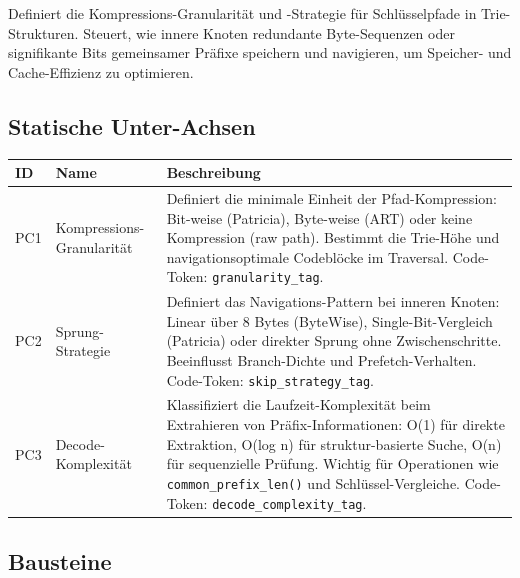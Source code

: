 Definiert die Kompressions-Granularität und -Strategie für Schlüsselpfade in Trie-Strukturen. Steuert, wie innere Knoten redundante Byte-Sequenzen oder signifikante Bits gemeinsamer Präfixe speichern und navigieren, um Speicher- und Cache-Effizienz zu optimieren.

\subsection*{Statische Unter-Achsen}

\begin{scriptsize}
\begin{longtable}{@{}>{\raggedright\arraybackslash}p{1.8cm} >{\raggedright\arraybackslash}p{3.2cm} >{\raggedright\arraybackslash}p{8.5cm}@{}}
\toprule
ID & Name & Beschreibung \\
\midrule
\endhead%
PC1 & Kompressions-Granularität & Definiert die minimale Einheit der Pfad-Kompression: Bit-weise (Patricia), Byte-weise (ART) oder keine Kompression (raw path). Bestimmt die Trie-Höhe und navigationsoptimale Codeblöcke im Traversal. Code-Token: \texttt{granularity\_\allowbreak{}tag}. \\
PC2 & Sprung-Strategie & Definiert das Navigations-Pattern bei inneren Knoten: Linear über 8 Bytes (Byte\allowbreak{}Wise), Single-Bit-Vergleich (Patricia) oder direkter Sprung ohne Zwischenschritte. Beeinflusst Branch-Dichte und Prefetch-Verhalten. Code-Token: \texttt{skip\_\allowbreak{}strategy\_\allowbreak{}tag}. \\
PC3 & Decode-Komplexität & Klassifiziert die Laufzeit-Komplexität beim Extrahieren von Präfix-Informationen: O(1) für direkte Extraktion, O(log n) für struktur-basierte Suche, O(n) für sequenzielle Prüfung. Wichtig für Operationen wie \texttt{common\_\allowbreak{}prefix\_\allowbreak{}len()} und Schlüssel-Vergleiche. Code-Token: \texttt{decode\_\allowbreak{}complexity\_\allowbreak{}tag}. \\
\bottomrule
\end{longtable}
\end{scriptsize}

\subsection*{Bausteine}

